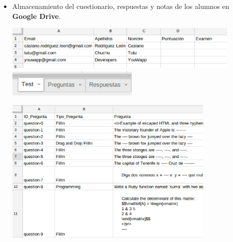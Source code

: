 \documentclass{beamer}
\begin{document}
\begin{frame}[allowframebreaks]
\begin{itemize}
    \framebreak
    
    \item Almacenamiento del cuestionario, respuestas y notas de los alumnos en {\bfseries Google Drive}.
    \bigskip
    \begin{center}
      \includegraphics[width=0.9\textwidth]{img/app0.eps}
      \newline
      \newline
      \includegraphics[width=0.5\textwidth]{img/app6.eps}
    \end{center}
    
    \framebreak
    
    \begin{center}
      \includegraphics[width=0.8\textwidth]{img/app3.eps}
    \end{center}
    \framebreak
    

\end{itemize}
\end{frame}
\end{document}
